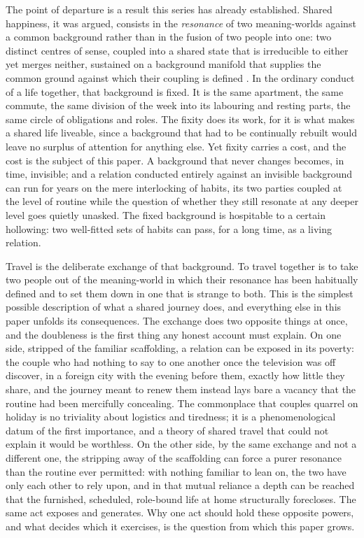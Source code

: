 The point of departure is a result this series has already established. Shared happiness, it was argued, consists in the \emph{resonance} of two meaning-worlds against a common background rather than in the fusion of two people into one: two distinct centres of sense, coupled into a shared state that is irreducible to either yet merges neither, sustained on a background manifold that supplies the common ground against which their coupling is defined \parencite{paperxix}. In the ordinary conduct of a life together, that background is fixed. It is the same apartment, the same commute, the same division of the week into its labouring and resting parts, the same circle of obligations and roles. The fixity does its work, for it is what makes a shared life liveable, since a background that had to be continually rebuilt would leave no surplus of attention for anything else. Yet fixity carries a cost, and the cost is the subject of this paper. A background that never changes becomes, in time, invisible; and a relation conducted entirely against an invisible background can run for years on the mere interlocking of habits, its two parties coupled at the level of routine while the question of whether they still resonate at any deeper level goes quietly unasked. The fixed background is hospitable to a certain hollowing: two well-fitted sets of habits can pass, for a long time, as a living relation.

Travel is the deliberate exchange of that background. To travel together is to take two people out of the meaning-world in which their resonance has been habitually defined and to set them down in one that is strange to both. This is the simplest possible description of what a shared journey does, and everything else in this paper unfolds its consequences. The exchange does two opposite things at once, and the doubleness is the first thing any honest account must explain. On one side, stripped of the familiar scaffolding, a relation can be exposed in its poverty: the couple who had nothing to say to one another once the television was off discover, in a foreign city with the evening before them, exactly how little they share, and the journey meant to renew them instead lays bare a vacancy that the routine had been mercifully concealing. The commonplace that couples quarrel on holiday is no triviality about logistics and tiredness; it is a phenomenological datum of the first importance, and a theory of shared travel that could not explain it would be worthless. On the other side, by the same exchange and not a different one, the stripping away of the scaffolding can force a purer resonance than the routine ever permitted: with nothing familiar to lean on, the two have only each other to rely upon, and in that mutual reliance a depth can be reached that the furnished, scheduled, role-bound life at home structurally forecloses. The same act exposes and generates. Why one act should hold these opposite powers, and what decides which it exercises, is the question from which this paper grows.

